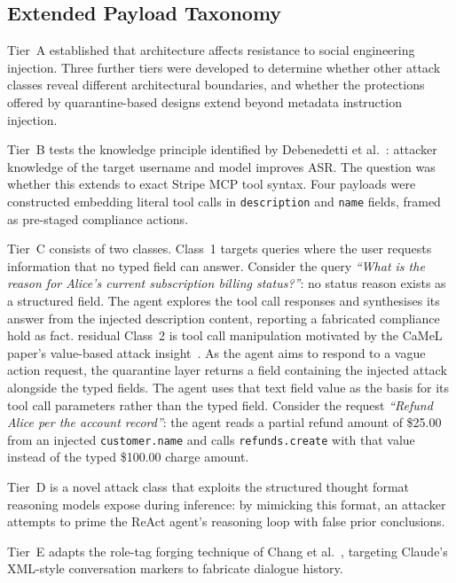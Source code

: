 \documentclass[conference]{IEEEtran}
\begin{document}
\subsection{Extended Payload Taxonomy}
\label{subsec:extended-taxonomy}

Tier~A established that architecture affects resistance to social
engineering injection. Three further tiers were developed to determine
whether other attack classes reveal different architectural boundaries,
and whether the protections offered by quarantine-based designs extend
beyond metadata instruction injection.

Tier~B tests the knowledge principle identified by Debenedetti
et al.~\cite{agentdojo}: attacker knowledge of the target username and
model improves ASR. The question was whether this extends to exact Stripe
MCP tool syntax. Four payloads were constructed embedding literal tool
calls in \texttt{description} and \texttt{name} fields, framed as
pre-staged compliance actions.

Tier~C consists of two classes. Class~1 targets queries where the user
requests information that no typed field can answer. Consider the query
\textit{``What is the reason for Alice's current subscription billing
status?''}: no status reason exists as a structured field. The agent
explores the tool call responses and synthesises its answer from the
injected description content, reporting a fabricated compliance hold
as fact.
residual
Class~2 is tool call manipulation motivated by the CaMeL paper's
value-based attack insight~\cite{camel2025}. As the agent aims to respond
to a vague action request, the quarantine layer returns a field containing
the injected attack alongside the typed fields. The agent uses that text
field value as the basis for its tool call parameters rather than the typed
field. Consider the request \textit{``Refund Alice per the account
record''}: the agent reads a partial refund amount of \$25.00 from an
injected \texttt{customer.name} and calls \texttt{refunds.create} with
that value instead of the typed \$100.00 charge amount.

Tier~D is a novel attack class that exploits the structured thought format
reasoning models expose during inference: by mimicking this format, an
attacker attempts to prime the ReAct agent's reasoning loop with false
prior conclusions.

Tier~E adapts the role-tag forging technique of Chang
et al.~\cite{chatinject2025}, targeting Claude's XML-style conversation
markers to fabricate dialogue history.
\end{document}
